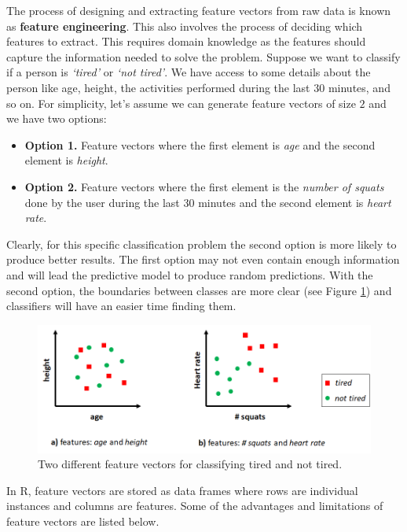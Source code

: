 \documentclass[
  11pt,
]{krantz}
\begin{document}
The process of designing and extracting feature vectors from raw data is known as \textbf{feature engineering}. This also involves the process of deciding which features to extract. This requires domain knowledge as the features should capture the information needed to solve the problem. Suppose we want to classify if a person is \emph{`tired'} or \emph{`not tired'}. We have access to some details about the person like age, height, the activities performed during the last \(30\) minutes, and so on. For simplicity, let's assume we can generate feature vectors of size \(2\) and we have two options:

\begin{itemize}
\item
  \textbf{Option 1.} Feature vectors where the first element is \emph{age} and the second element is \emph{height}.
\item
  \textbf{Option 2.} Feature vectors where the first element is the \emph{number of squats} done by the user during the last \(30\) minutes and the second element is \emph{heart rate}.
\end{itemize}

Clearly, for this specific classification problem the second option is more likely to produce better results. The first option may not even contain enough information and will lead the predictive model to produce random predictions. With the second option, the boundaries between classes are more clear (see Figure \ref{fig:tired}) and classifiers will have an easier time finding them.

\begin{figure}

{\centering \includegraphics[width=0.9\linewidth]{images/tired} 

}

\caption{Two different feature vectors for classifying tired and not tired.}\label{fig:tired}
\end{figure}

In R, feature vectors are stored as data frames where rows are individual instances and columns are features. Some of the advantages and limitations of feature vectors are listed below.
\end{document}
